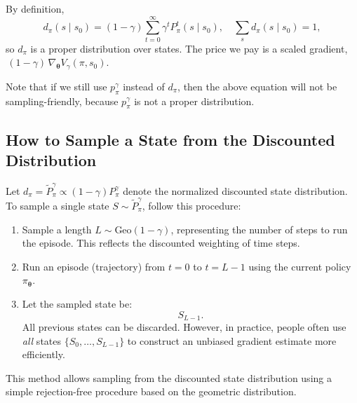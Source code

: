 By definition,
\[
d_{\pi}(s\mid s_{0})
=(1-\gamma)\sum_{t=0}^{\infty}\gamma^{t}P_{\pi}^{t}(s\mid s_{0}),
\quad
\sum_{s}d_{\pi}(s\mid s_{0})=1,
\]
so \(d_{\pi}\) is a proper distribution over states. The price we pay is a scaled gradient,
\(\,(1-\gamma)\,\nabla_{\boldsymbol{\theta}}V_{\gamma}(\pi, s_{0})\).


Note that if we still use $p_\pi^{\gamma}$ instead of $d_\pi$, then the above equation will not be sampling-friendly, because $p_\pi^{\gamma}$ is not a proper distribution.


\subsection{How to Sample a State from the Discounted Distribution}
Let \(d_{\pi} = \widetilde{P}^{\gamma}_{\pi} \propto (1 - \gamma) P^{\gamma}_{\pi} \) denote the normalized discounted state distribution. To sample a single state \( S \sim \widetilde{P}^{\gamma}_{\pi} \), follow this procedure:
\begin{enumerate}
    \item Sample a length \( L \sim \text{Geo}(1 - \gamma) \), representing the number of steps to run the episode. This reflects the discounted weighting of time steps.
    \item Run an episode (trajectory) from \( t = 0 \) to \( t = L - 1 \) using the current policy \( \pi_{\boldsymbol{\theta}} \).
    \item Let the sampled state be:
    \[
    S_{L-1}.
    \]
    All previous states can be discarded. However, in practice, people often use \emph{all} states \( \{S_0, \dots, S_{L-1}\} \) to construct an unbiased gradient estimate more efficiently.
\end{enumerate}

This method allows sampling from the discounted state distribution using a simple rejection-free procedure based on the geometric distribution.


